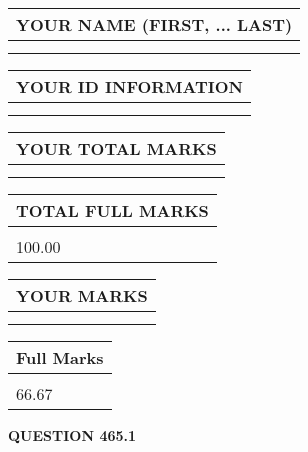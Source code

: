 \documentclass{ctexart}
\begin{document}
   
   
   
\newpage 
\setcounter{page}{ 
   465001 } 
   
   
   
   
\noindent\begin{tabular}{|l|}
\hline
YOUR NAME (FIRST, ... LAST)  \\
\hline
 \\ 
 \\ 
\hline
\end{tabular}
\hspace{0.05in} \begin{tabular}{|l|}
\hline
 YOUR   ID   INFORMATION  \\
\hline
 \\ 
 \\ 
\hline
\end{tabular}
   
   
\vspace{0.2in}\noindent\begin{tabular}{|l|}
\hline
YOUR TOTAL MARKS  \\
\hline
 \\ 
 \\ 
\hline
\end{tabular}
\hspace{0.05in} \begin{tabular}{|l|}
\hline
TOTAL FULL MARKS  \\
\hline
 \\ 
100.00 \\
\hline
\end{tabular}
   
   
 \vspace{0.2in}
 
 
 
 
   
   
  
\vspace{0.2in}
  
\noindent\begin{tabular}{|l|}
\hline
 YOUR MARKS  \\
\hline
 \\ 
 \\ 
\hline
\end{tabular}
\hspace{0.05in} \begin{tabular}{|l|}
\hline
 Full Marks  \\
\hline
 \\ 
66.67 \\
\hline
\end{tabular}
{\textbf{\Large{QUESTION
465.1 
}}}
  
\end{document}

